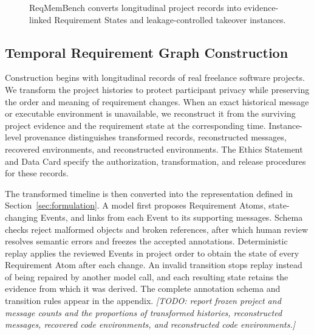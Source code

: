 \documentclass{article} %
\newcommand{\placeholder}[1]{\emph{[#1]}}
\begin{document}
\begin{figure}[h]
\centering
{}
\caption{ReqMemBench converts longitudinal project records into evidence-linked Requirement States and leakage-controlled takeover instances.}
\label{fig:pipeline}
\end{figure}

\subsection{Temporal Requirement Graph Construction}

Construction begins with longitudinal records of real freelance software projects. We transform the project histories to protect participant privacy while preserving the order and meaning of requirement changes. When an exact historical message or executable environment is unavailable, we reconstruct it from the surviving project evidence and the requirement state at the corresponding time. Instance-level provenance distinguishes transformed records, reconstructed messages, recovered environments, and reconstructed environments. The Ethics Statement and Data Card specify the authorization, transformation, and release procedures for these records.

The transformed timeline is then converted into the representation defined in Section~\ref{sec:formulation}. A model first proposes Requirement Atoms, state-changing Events, and links from each Event to its supporting messages. Schema checks reject malformed objects and broken references, after which human review resolves semantic errors and freezes the accepted annotations. Deterministic replay applies the reviewed Events in project order to obtain the state of every Requirement Atom after each change. An invalid transition stops replay instead of being repaired by another model call, and each resulting state retains the evidence from which it was derived. The complete annotation schema and transition rules appear in the appendix.
\placeholder{TODO: report frozen project and message counts and the proportions of transformed histories, reconstructed messages, recovered code environments, and reconstructed code environments.}
\end{document}
